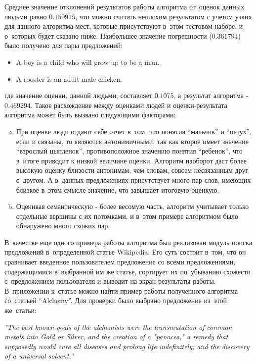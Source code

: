 Среднее значение отклонений результатов работы алгоритма от~оценок данных людьми равно $0.150915$,
что можно считать неплохим результатом с учетом узких для данного алгоритма мест,
которые присутствуют в~этом тестовом наборе, и о~которых будет сказано ниже. 
Наибольшее значение погрешности ($0.361794$) было получено для пары предложений:
\begin{itemize}
\item {
	A boy is a child who will grow up to be a man.
}
\item {
	A rooster is an adult male chicken.
}
\end{itemize}
где значение оценки, данной людьми, составляет $0.1075$, а результат алгоритма - $0.469294$.
Такое расхождение между оценками людей и оценки-результата алгоритма может быть вызвано
следующими факторами:
\begin{enumerate}[a.]
\item {
При оценке люди отдают себе отчет в~том, что понятия ``мальчик'' и ``петух'', если и связаны,
то являются антонимичными, так как второе имеет значение ``взрослый цыпленок'', противоположное
значению понятия ``ребенок'', что в~итоге приводит к низкой величине оценки. 
Алгоритм наоборот даст более высокую оценку близости антонимам, чем словам,
совсем несвязанным друг с~другом. А в~данных предложениях присутствует
много пар слов, имеющих близкое в~этом смысле значение, что завышает итоговую оценкую.
}
\item {
Оценивая семантическую - более весомую часть, алгоритм учитывает только отдельные вершины
с их потомками, и в~этом примере алгоритмом было обнаружено много схожих пар.
}
\end{enumerate}

В~качестве еще одного примера работы алгоритма был реализован
модуль поиска предложений в~определенной статье Wikipedia.
Его суть состоит в~том, что он сравнивает введенное пользователем предложение
со всеми предложениями, содержащимися в~выбранной им же статье, сортирует их по~убыванию
схожести с~предложением пользователя и выводит на экран результаты работы.
В~приложении к~статье можно найти пример работы полученного алгоритма со~статьей ``Alchemy''.
Для проверки было выбрано предложение из~этой же~статьи:

\textit{"The best known goals of the alchemists were the transmutation of common metals into Gold or Silver, and the creation of a "panacea," a remedy that supposedly would cure all diseases and prolong life indefinitely; and the discovery of a universal solvent."}

